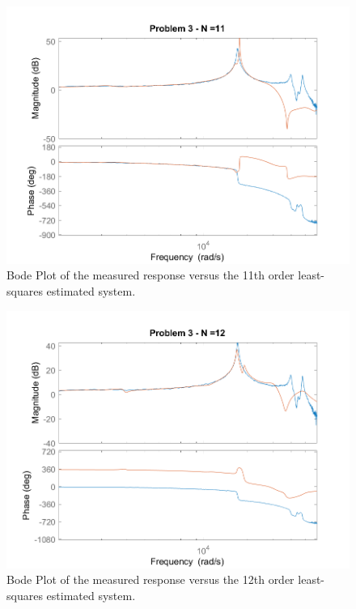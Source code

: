 \documentclass[]{article}
\begin{document}
		\begin{figure}[h]
			\centering
			\includegraphics[width=0.7\linewidth]{fig/MECH6325_CA1_pblm3_n=11}
			\caption{Bode Plot of the measured response versus the 11th order least-squares estimated system.}
			\label{fig:pblm3_n=11}
		\end{figure}

		\begin{figure}[h]
			\centering
			\includegraphics[width=0.7\linewidth]{fig/MECH6325_CA1_pblm3_n=12}
			\caption{Bode Plot of the measured response versus the 12th order least-squares estimated system.}
			\label{fig:pblm3_n=12}
		\end{figure}
		
		
\end{document}
